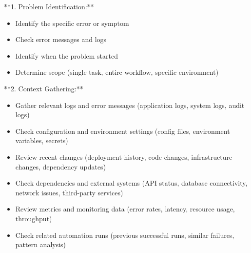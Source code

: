 \documentclass[11pt,a4paper]{article}
\begin{document}
**1. Problem Identification:**

\begin{itemize}
\item Identify the specific error or symptom
\end{itemize}

\begin{itemize}
\item Check error messages and logs
\end{itemize}

\begin{itemize}
\item Identify when the problem started
\end{itemize}

\begin{itemize}
\item Determine scope (single task, entire workflow, specific environment)
\end{itemize}

**2. Context Gathering:**

\begin{itemize}
\item Gather relevant logs and error messages (application logs, system logs, audit logs)
\end{itemize}

\begin{itemize}
\item Check configuration and environment settings (config files, environment variables, secrets)
\end{itemize}

\begin{itemize}
\item Review recent changes (deployment history, code changes, infrastructure changes, dependency updates)
\end{itemize}

\begin{itemize}
\item Check dependencies and external systems (API status, database connectivity, network issues, third-party services)
\end{itemize}

\begin{itemize}
\item Review metrics and monitoring data (error rates, latency, resource usage, throughput)
\end{itemize}

\begin{itemize}
\item Check related automation runs (previous successful runs, similar failures, pattern analysis)
\end{itemize}
\end{document}
